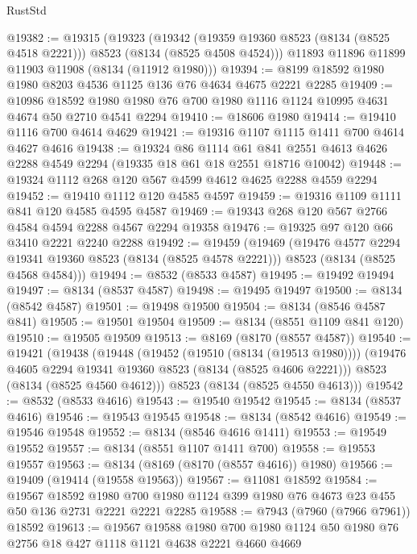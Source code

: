 \begin{lexlean}{RustStd}
\begin{coremodule}
@19382 := @19315
    (@19323
      (@19342 (@19359 @19360 @8523 (@8134 (@8525 @4518 @2221))) @8523 (@8134 (@8525 @4508 @4524)))
      @11893
      @11896
      @11899
      @11903
      @11908
      (@8134 (@11912 @1980)))
@19394 := @8199 @18592 @1980 @1980 @8203 @4536 @1125 @136 @76 @4634 @4675 @2221 @2285
@19409 := @10986
    @18592
    @1980
    @1980
    @76
    @700
    @1980
    @1116
    @1124
    @10995
    @4631
    @4674
    @50
    @2710
    @4541
    @2294
@19410 := @18606 @1980
@19414 := @19410 @1116 @700 @4614 @4629
@19421 := @19316 @1107 @1115 @1411 @700 @4614 @4627 @4616
@19438 := @19324
    @86
    @1114
    @61
    @841
    @2551
    @4613
    @4626
    @2288
    @4549
    @2294
    (@19335 @18 @61 @18 @2551 @18716 @10042)
@19448 := @19324 @1112 @268 @120 @567 @4599 @4612 @4625 @2288 @4559 @2294
@19452 := @19410 @1112 @120 @4585 @4597
@19459 := @19316 @1109 @1111 @841 @120 @4585 @4595 @4587
@19469 := @19343 @268 @120 @567 @2766 @4584 @4594 @2288 @4567 @2294 @19358
@19476 := @19325 @97 @120 @66 @3410 @2221 @2240 @2288
@19492 := @19459
    (@19469
      (@19476 @4577 @2294 @19341 @19360 @8523 (@8134 (@8525 @4578 @2221)))
      @8523
      (@8134 (@8525 @4568 @4584)))
@19494 := @8532 (@8533 @4587)
@19495 := @19492 @19494
@19497 := @8134 (@8537 @4587)
@19498 := @19495 @19497
@19500 := @8134 (@8542 @4587)
@19501 := @19498 @19500
@19504 := @8134 (@8546 @4587 @841)
@19505 := @19501 @19504
@19509 := @8134 (@8551 @1109 @841 @120)
@19510 := @19505 @19509
@19513 := @8169 (@8170 (@8557 @4587))
@19540 := @19421
    (@19438
      (@19448
        (@19452 (@19510 (@8134 (@19513 @1980))))
        (@19476 @4605 @2294 @19341 @19360 @8523 (@8134 (@8525 @4606 @2221)))
        @8523
        (@8134 (@8525 @4560 @4612)))
      @8523
      (@8134 (@8525 @4550 @4613)))
@19542 := @8532 (@8533 @4616)
@19543 := @19540 @19542
@19545 := @8134 (@8537 @4616)
@19546 := @19543 @19545
@19548 := @8134 (@8542 @4616)
@19549 := @19546 @19548
@19552 := @8134 (@8546 @4616 @1411)
@19553 := @19549 @19552
@19557 := @8134 (@8551 @1107 @1411 @700)
@19558 := @19553 @19557
@19563 := @8134 (@8169 (@8170 (@8557 @4616)) @1980)
@19566 := @19409 (@19414 (@19558 @19563))
@19567 := @11081 @18592
@19584 := @19567
    @18592
    @1980
    @700
    @1980
    @1124
    @399
    @1980
    @76
    @4673
    @23
    @455
    @50
    @136
    @2731
    @2221
    @2221
    @2285
@19588 := @7943 (@7960 (@7966 @7961)) @18592
@19613 := @19567
    @19588
    @1980
    @700
    @1980
    @1124
    @50
    @1980
    @76
    @2756
    @18
    @427
    @1118
    @1121
    @4638
    @2221
    @4660
    @4669

\end{coremodule}
\end{lexlean}
